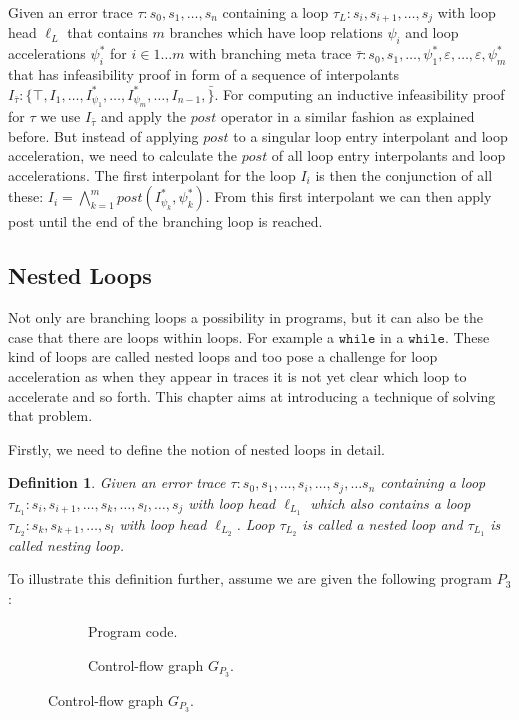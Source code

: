 \documentclass{article}
\newcommand{\loc}[1]{\ensuremath{\ell_{#1}}\xspace}
\newcounter{example}[section]
\newtheorem{mydef}{Definition}
\newcommand\mycom[1]{}
\newcommand\mycom[1]{#1}
\newcommand{\ts}[1]{\mycom{\todo[color=green!40,inline]{\small TS: #1}}}
\begin{document}
Given an error trace $\tau: s_0, s_1, \ldots, s_n$ containing a loop $\tau_L: s_i, s_{i+1}, \ldots, s_j$ with loop head $\loc{L}$ that contains $m$ branches which have loop relations $\psi_i$ and loop accelerations $\psi_{i}^*$ for $i \in 1 \ldots m$ with branching meta trace $\bar{\tau}: s_0, s_1, \ldots, \psi_{1}^*, \varepsilon, \ldots, \varepsilon, \psi_{m}^*$ that has infeasibility proof in form of a sequence of interpolants $I_{\bar{\tau}}: \{\top, I_1, \ldots, I_{\psi_{1}}^*, \ldots, I_{\psi_{m}}^*, \ldots, I_{n - 1}, \bar \}$. For computing an inductive infeasibility proof for $\tau$ we use $I_{\bar{\tau}}$ and apply the $post$ operator in a similar fashion as explained before. But instead of applying $post$ to a singular loop entry interpolant and loop acceleration, we need to calculate the $post$ of all loop entry interpolants and loop accelerations. The first interpolant for the loop $I_i$ is then the conjunction of all these: $I_i = \bigwedge_{k=1}^{m} post(I_{\psi_k}^*, \psi_k^*)$. From this first interpolant we can then apply post until the end of the branching loop is reached.
\ts{Explain why this works.}


\subsection{Nested Loops}
Not only are branching loops a possibility in programs, but it can also be the case that there are loops within loops. For example a $\texttt{while}$ in a $\texttt{while}$. These kind of loops are called nested loops and too pose a challenge for loop acceleration as when they appear in traces it is not yet clear which loop to accelerate and so forth. This chapter aims at introducing a technique of solving that problem. \\ \par

Firstly, we need to define the notion of nested loops in detail.
\begin{mydef}
	Given an error trace $\tau: s_0, s_1, \ldots, s_i, \ldots, s_j, \ldots s_n$ containing a loop \\ $\tau_{L_1}: s_i, s_{i+1}, \ldots, s_k, \ldots, s_l, \ldots, s_j$ with loop head $\loc{L_1}$ which also contains a loop $\tau_{L_2}: s_k, s_{k+1}, \ldots, s_l$ with loop head $\loc{L_2}$.
	Loop $\tau_{L_2}$ is called a nested loop and $\tau_{L_1}$ is called nesting loop.
\end{mydef}

To illustrate this definition further, assume we are given the following program $P_3$: \\
\begin{figure}[H]
	\centering
	\begin{subfigure}{0.3\textwidth}
		\centering
		
		\caption{Program code.}
	\end{subfigure}
	\hfill
	\begin{subfigure}{0.6\textwidth}
		\centering
		
		\caption{Control-flow graph $G_{P_3}$.}
	\end{subfigure}
	\label{fig:ex:p3}
\end{figure}
\end{document}
